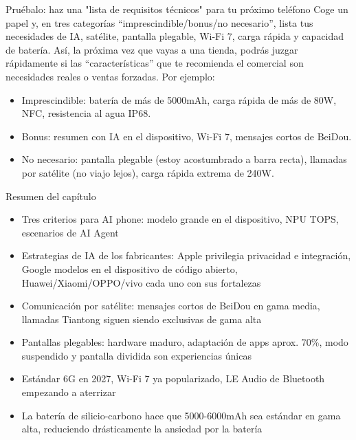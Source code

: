 \begin{tcbpractice}{Pruébalo: haz una "lista de requisitos técnicos" para tu próximo teléfono}
Coge un papel y, en tres categorías “imprescindible/bonus/no necesario”, lista tus necesidades de IA, satélite, pantalla plegable, Wi-Fi 7, carga rápida y capacidad de batería. Así, la próxima vez que vayas a una tienda, podrás juzgar rápidamente si las “características” que te recomienda el comercial son necesidades reales o ventas forzadas. Por ejemplo:

\begin{itemize}
  \item Imprescindible: batería de más de 5000mAh, carga rápida de más de 80W, NFC, resistencia al agua IP68.
  \item Bonus: resumen con IA en el dispositivo, Wi-Fi 7, mensajes cortos de BeiDou.
  \item No necesario: pantalla plegable (estoy acostumbrado a barra recta), llamadas por satélite (no viajo lejos), carga rápida extrema de 240W.
\end{itemize}

\end{tcbpractice}

\begin{tcbsummary}{Resumen del capítulo}
\begin{itemize}
  \item Tres criterios para AI phone: modelo grande en el dispositivo, NPU TOPS, escenarios de AI Agent
  \item Estrategias de IA de los fabricantes: Apple privilegia privacidad e integración, Google modelos en el dispositivo de código abierto, Huawei/Xiaomi/OPPO/vivo cada uno con sus fortalezas
  \item Comunicación por satélite: mensajes cortos de BeiDou en gama media, llamadas Tiantong siguen siendo exclusivas de gama alta
  \item Pantallas plegables: hardware maduro, adaptación de apps aprox. 70\%, modo suspendido y pantalla dividida son experiencias únicas
  \item Estándar 6G en 2027, Wi-Fi 7 ya popularizado, LE Audio de Bluetooth empezando a aterrizar
  \item La batería de silicio-carbono hace que 5000-6000mAh sea estándar en gama alta, reduciendo drásticamente la ansiedad por la batería
\end{itemize}

\end{tcbsummary}
